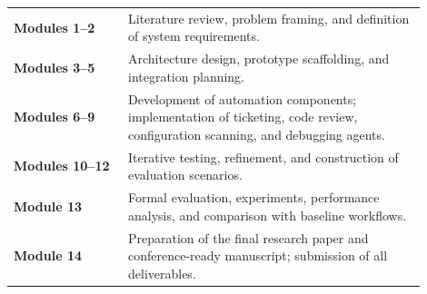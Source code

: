 \documentclass[11pt]{article}
\begin{document}
\begin{tabular}{p{0.25\linewidth} p{0.65\linewidth}}
\textbf{Modules 1--2}  & Literature review, problem framing, and definition of system requirements. \\
\textbf{Modules 3--5}  & Architecture design, prototype scaffolding, and integration planning. \\
\textbf{Modules 6--9}  & Development of automation components; implementation of ticketing, code review, configuration scanning, and debugging agents. \\
\textbf{Modules 10--12} & Iterative testing, refinement, and construction of evaluation scenarios. \\
\textbf{Module 13} & Formal evaluation, experiments, performance analysis, and comparison with baseline workflows. \\
\textbf{Module 14} & Preparation of the final research paper and conference-ready manuscript; submission of all deliverables. \\
\end{tabular}

\end{document}
